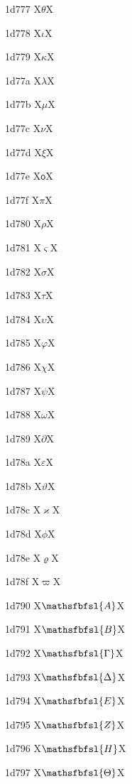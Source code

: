 \documentclass[11pt]{article}
\begin{document}
1d777 X{\ensuremath{\mathsf{\theta}}}X

1d778 X{\ensuremath{\mathsf{\iota}}}X

1d779 X{\ensuremath{\mathsf{\kappa}}}X

1d77a X{\ensuremath{\mathsf{\lambda}}}X

1d77b X{\ensuremath{\mathsf{\mu}}}X

1d77c X{\ensuremath{\mathsf{\nu}}}X

1d77d X{\ensuremath{\mathsf{\xi}}}X

1d77e X{\ensuremath{\mathsf{o}}}X

1d77f X{\ensuremath{\mathsf{\pi}}}X

1d780 X{\ensuremath{\mathsf{\rho}}}X

1d781 X{\ensuremath{\mathsf{\varsigma}}}X

1d782 X{\ensuremath{\mathsf{\sigma}}}X

1d783 X{\ensuremath{\mathsf{\tau}}}X

1d784 X{\ensuremath{\mathsf{\upsilon}}}X

1d785 X{\ensuremath{\mathsf{\varphi}}}X

1d786 X{\ensuremath{\mathsf{\chi}}}X

1d787 X{\ensuremath{\mathsf{\psi}}}X

1d788 X{\ensuremath{\mathsf{\omega}}}X

1d789 X{\ensuremath{\mathsf{\partial}}}X

1d78a X{\ensuremath{\mathsf{\varepsilon}}}X

1d78b X{\ensuremath{\mathsf{\vartheta}}}X

1d78c X{\ensuremath{\mathsf{\varkappa}}}X

1d78d X{\ensuremath{\mathsf{\phi}}}X

1d78e X{\ensuremath{\mathsf{\varrho}}}X

1d78f X{\ensuremath{\mathsf{\varpi}}}X

1d790 X{\ensuremath{\mathsfbfsl{A}}}X

1d791 X{\ensuremath{\mathsfbfsl{B}}}X

1d792 X{\ensuremath{\mathsfbfsl{\Gamma}}}X

1d793 X{\ensuremath{\mathsfbfsl{\Delta}}}X

1d794 X{\ensuremath{\mathsfbfsl{E}}}X

1d795 X{\ensuremath{\mathsfbfsl{Z}}}X

1d796 X{\ensuremath{\mathsfbfsl{H}}}X

1d797 X{\ensuremath{\mathsfbfsl{\Theta}}}X
\end{document}
